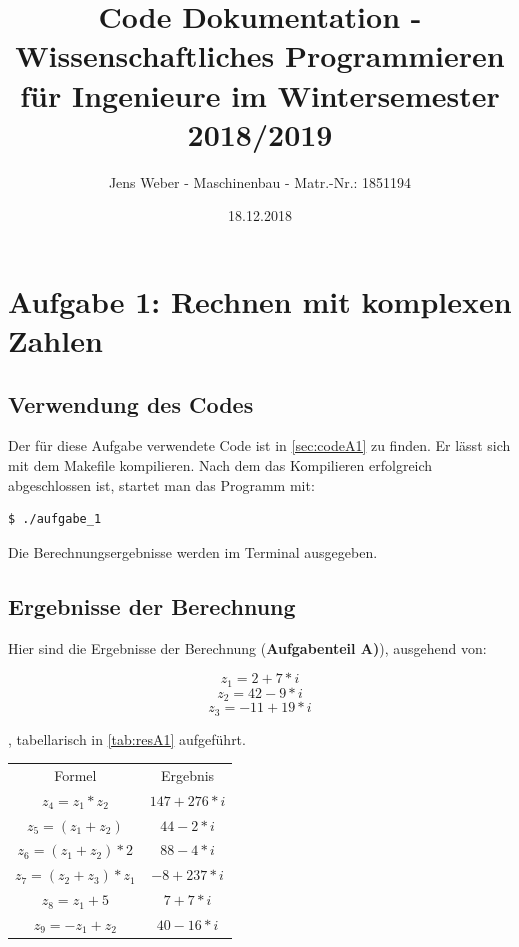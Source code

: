 \documentclass{report}
\title{Code Dokumentation - Wissenschaftliches Programmieren für Ingenieure im Wintersemester 2018/2019}
\author{Jens Weber - Maschinenbau - Matr.-Nr.: 1851194}
\date{18.12.2018}
\begin{document}
\maketitle{}
\clearpage{}


\tableofcontents{}
\clearpage{}

\chapter{Aufgabe 1: Rechnen mit komplexen Zahlen}

\section{Verwendung des Codes}\label{sec:verwendungA1}

Der für diese Aufgabe verwendete Code ist in \ref{sec:codeA1} zu finden. Er lässt sich mit dem Makefile kompilieren.
Nach dem das Kompilieren erfolgreich abgeschlossen ist, startet man das Programm mit:
\begin{lstlisting}[language=bash]
  $ ./aufgabe_1
\end{lstlisting}
Die Berechnungsergebnisse werden im Terminal ausgegeben.



\section{Ergebnisse der Berechnung}\label{sec:ergebnisseA1}
Hier sind die Ergebnisse der Berechnung (\textbf{Aufgabenteil A)}), ausgehend von:

\begin{equation}\label{eq:gegZ1}
  z_1 = 2 + 7*i
\end{equation}
\begin{equation}\label{eq:gegZ2}
  z_2 = 42 - 9*i
\end{equation}
\begin{equation}\label{eq:gegZ3}
  z_3 = -11 + 19*i
\end{equation}


, tabellarisch in \ref{tab:resA1} aufgeführt.
\bigskip %

\begin{center}
\begin{tabular}{c|c}\label{tab:resA1}
Formel & Ergebnis \\
\cline{1-2}
$z_4 = z_1 * z_2$ & $147 + 276*i$ \\
\cline{1-2}
$z_5 = (z_1 + z_2)$ & $44 - 2*i$ \\
\cline{1-2}
$z_6 = (z_1 + z_2)*2$ & $88 - 4*i$  \\
\cline{1-2}
$z_7 = (z_2 + z_3)*z_1$ & $-8 + 237*i$ \\
\cline{1-2}
$z_8 = z_1 + 5$ & $7 + 7*i$ \\
\cline{1-2}
$z_9 = -z_1 + z_2$ & $40 - 16*i$ \\
\cline{1-2}
\end{tabular}
\label{table:resA1}
\end{center}
\end{document}

